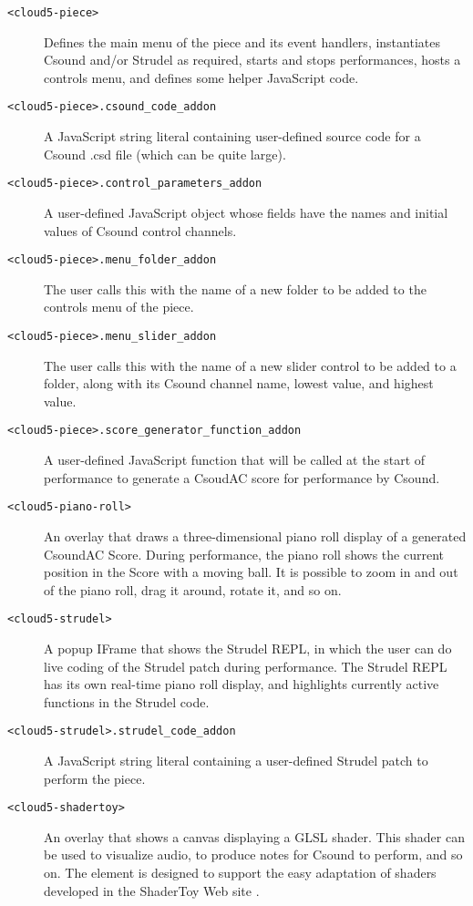 \documentclass[runningheads,a4paper]{llncs}
\begin{document}
\begin{description}
\item[\texttt{<cloud5-piece>}] Defines the main menu of the piece and its event handlers, instantiates Csound and/or Strudel as required, starts and stops performances, hosts a controls menu, and defines some helper JavaScript code.
\item[\texttt{<cloud5-piece>.csound\_code\_addon}]  A JavaScript string literal containing user-defined source code for a Csound .csd file (which can be quite large).
\item[\texttt{<cloud5-piece>.control\_parameters\_addon}]  A user-defined JavaScript object whose fields have the names and initial values of Csound control channels.
\item[\texttt{<cloud5-piece>.menu\_folder\_addon}]  The user calls this with the name of a new folder to be added to the controls menu of the piece.
\item[\texttt{<cloud5-piece>.menu\_slider\_addon}]  The user calls this with the name of a new slider control to be added to a folder, along with its Csound channel name, lowest value, and highest value.
\item[\texttt{<cloud5-piece>.score\_generator\_function\_addon}]  A user-defined JavaScript function that will be called at the start of performance to generate a CsoudAC score for performance by Csound. 
\item[\texttt{<cloud5-piano-roll>}] An overlay that draws a three-dimensional piano roll display of a generated CsoundAC Score. During performance, the piano roll shows the current position in the Score with a moving ball. It is possible to zoom in and out of the piano roll, drag it around, rotate it, and so on.
\item[\texttt{<cloud5-strudel>}] A popup IFrame that shows the Strudel REPL, in which the user can do live coding of the Strudel patch during performance. The Strudel REPL has its own real-time piano roll display, and highlights currently active functions in the Strudel code.
\item[\texttt{<cloud5-strudel>.strudel\_code\_addon}] A JavaScript string literal containing a user-defined  Strudel patch to perform the piece.
\item[\texttt{<cloud5-shadertoy>}] An overlay that shows a canvas displaying a GLSL shader. This shader can be used to visualize audio, to produce notes for Csound to perform, and so on. The element is designed to support the easy adaptation of shaders developed in the ShaderToy Web site \cite{shadertoy}.

\end{description}
\end{document}
